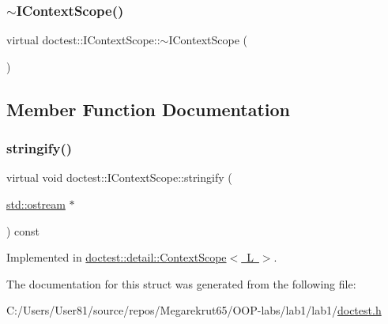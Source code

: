 \mbox{\label{structdoctest_1_1_i_context_scope_aa99357c233d6a040451628bc6a6c6c2e}} 
\subsubsection{\texorpdfstring{$\sim$\+I\+Context\+Scope()}{~IContextScope()}}
{\footnotesize\ttfamily virtual doctest\+::\+I\+Context\+Scope\+::$\sim$\+I\+Context\+Scope (\begin{DoxyParamCaption}{ }\end{DoxyParamCaption})\hspace{0.3cm}{\ttfamily [virtual]}}



\subsection{Member Function Documentation}
\mbox{\label{structdoctest_1_1_i_context_scope_affbf0f9bf8107a4a8a805d237288141d}} 
\subsubsection{\texorpdfstring{stringify()}{stringify()}}
{\footnotesize\ttfamily virtual void doctest\+::\+I\+Context\+Scope\+::stringify (\begin{DoxyParamCaption}\item[{\mbox{\hyperlink{doctest_8h_a116af65cb5e924b33ad9d9ecd7a783f3}{std\+::ostream}} $\ast$}]{ }\end{DoxyParamCaption}) const\hspace{0.3cm}{\ttfamily [pure virtual]}}



Implemented in \mbox{\hyperlink{classdoctest_1_1detail_1_1_context_scope_a4636ac32ae41ae108c7ada4a164ffaeb}{doctest\+::detail\+::\+Context\+Scope$<$ L $>$}}.



The documentation for this struct was generated from the following file\+:\begin{DoxyCompactItemize}
\item 
C\+:/\+Users/\+User81/source/repos/\+Megarekrut65/\+O\+O\+P-\/labs/lab1/lab1/\mbox{\hyperlink{doctest_8h}{doctest.\+h}}\end{DoxyCompactItemize}
